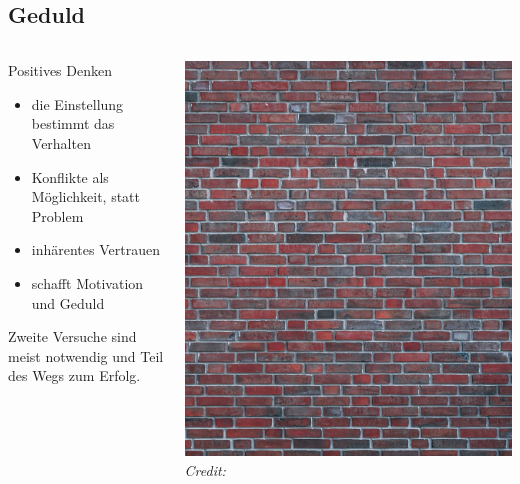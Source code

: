 \subsection{Geduld} \label{sec:geduld}

\begin{frame}
    
  \begin{columns}[c]

  \begin{column}{0.55\textwidth}

    Positives Denken \cite[][p. 33ff]{mccarthy_advanced_2015}
    \begin{itemize}
      \item die Einstellung bestimmt das Verhalten
      \item Konflikte als Möglichkeit, statt Problem
      \item inhärentes Vertrauen
      \item schafft Motivation und Geduld
    \end{itemize}
  
    Zweite Versuche sind meist notwendig und Teil des Wegs zum Erfolg. 

  \end{column}
  
  \begin{column}{0.35\textwidth}
      \includegraphics[width=\textwidth]{content/fig/brickwall.jpg}
      {\hspace*{15pt}\hbox{\scriptsize\itshape Credit:}}
  \end{column}


\end{columns}

\end{frame}

